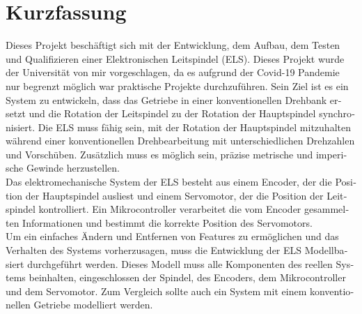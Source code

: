 \chapter*{Kurzfassung}
\label{kurzfassung}
\begin{otherlanguage}{ngerman}

    Dieses Projekt beschäftigt sich mit der Entwicklung, dem Aufbau, dem Testen und Qualifizieren einer Elektronischen Leitspindel (ELS). Dieses Projekt wurde der Universität von mir vorgeschlagen, da es aufgrund der Covid-19 Pandemie nur begrenzt möglich war praktische Projekte durchzuführen. Sein Ziel ist es ein System zu entwickeln, dass das Getriebe in einer konventionellen Drehbank ersetzt und die Rotation der Leitspindel zu der Rotation der Hauptspindel synchronisiert. Die ELS muss fähig sein, mit der Rotation der Hauptspindel mitzuhalten während einer konventionellen Drehbearbeitung mit unterschiedlichen Drehzahlen und Vorschüben. Zusätzlich muss es möglich sein, präzise metrische und imperische Gewinde herzustellen.\\
 
    Das elektromechanische System der ELS besteht aus einem Encoder, der die Position der Hauptspindel ausliest und einem Servomotor, der die Position der Leitspindel kontrolliert. Ein Mikrocontroller
    verarbeitet die vom Encoder gesammelten Informationen und bestimmt die korrekte Position des Servomotors.\\
    Um ein einfaches Ändern und Entfernen von Features zu ermöglichen und das Verhalten des Systems vorherzusagen, muss die Entwicklung der ELS Modellbasiert durchgeführt werden. Dieses Modell muss alle Komponenten des reellen Systems beinhalten, eingeschlossen der Spindel, des Encoders, dem Mikrocontroller und dem Servomotor. Zum Vergleich sollte auch ein System mit einem konventionellen Getriebe modelliert werden.
    
\end{otherlanguage}
